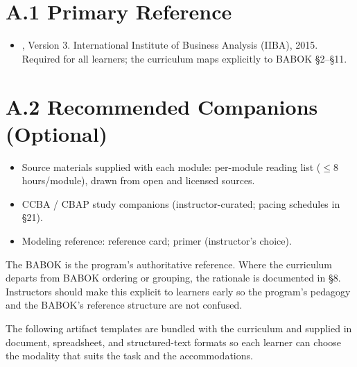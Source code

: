 \documentclass[11pt,letterpaper,oneside]{report}
\begin{document}

\section*{A.1 Primary Reference}
\begin{itemize}
  \item {}, Version 3. International Institute of Business Analysis (IIBA), 2015. Required for all learners; the curriculum maps explicitly to BABOK \S2--\S11.
\end{itemize}

\section*{A.2 Recommended Companions (Optional)}
\begin{itemize}
  \item Source materials supplied with each module: per-module reading list ($\leq$8 hours/module), drawn from open and licensed sources.
  \item CCBA / CBAP study companions (instructor-curated; pacing schedules in \S21).
  \item Modeling reference:  reference card;  primer (instructor's choice).
\end{itemize}

\begin{infobox}
The BABOK is the program's authoritative reference. Where the curriculum departs from BABOK ordering or grouping, the rationale is documented in \S8. Instructors should make this explicit to learners early so the program's pedagogy and the BABOK's reference structure are not confused.
\end{infobox}


The following artifact templates are bundled with the curriculum and supplied in document, spreadsheet, and structured-text formats so each learner can choose the modality that suits the task and the accommodations.
\end{document}
